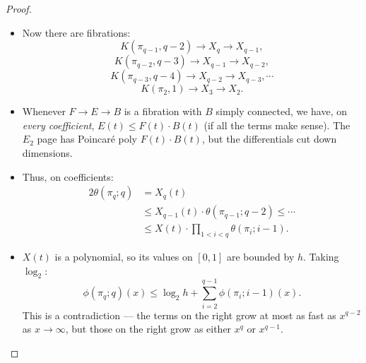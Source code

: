\documentclass[11pt]{article}
\begin{document}
\begin{SerreCohModTwoEilMacLane}
\begin{proof}
\begin{itemize}
\item %
Now there are fibrations:
\[K(\pi_{q-1},q-2)\to X_{q}\to X_{q-1},\]
\[K(\pi_{q-2},q-3)\to X_{q-1}\to X_{q-2},\]
\[K(\pi_{q-3},q-4)\to X_{q-2}\to X_{q-3},\cdots\]
\[K(\pi_{2},1)\to X_{3}\to X_2.\]
\item Whenever $F\to E\to B$ is a fibration with $B$ simply connected, we have, on \emph{every coefficient}, $E(t)\leq F(t)\cdot B(t)$ (if all the terms make sense). The $E_2$ page has Poincar\'e poly $F(t)\cdot B(t)$, but the differentials cut down dimensions.
\item Thus, on coefficients:
\begin{alignat*}{2}
\theta(\pi_q;q)&= X_q(t)\\
&\leq X_{q-1}(t)\cdot\theta(\pi_{q-1};q-2)\leq\cdots\\
&\leq X(t)\cdot \prod_{1<i<q}\theta(\pi_i;i-1).
\end{alignat*}
\item $X(t)$ is a polynomial, so its values on $[0,1]$ are bounded by $h$. Taking $\log_2$:
\[\phi(\pi_q;q)(x)\leq\log_2h+\sum_{i=2}^{q-1}\phi(\pi_i;i-1)(x).\]
This is a contradiction --- the terms on the right grow at most as fast as $x^{q-2}$ as $x\to\infty$, but those on the right grow as either $x^q$ or $x^{q-1}$.\qedhere
\end{itemize}
\end{proof}

\pagebreak
\end{SerreCohModTwoEilMacLane}
\end{document}
